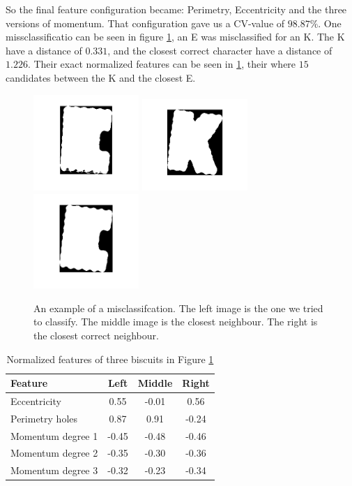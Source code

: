 \documentclass[a4paper,11pt]{article}
\begin{document}
So the final feature configuration became: Perimetry, Eccentricity and the three versions of momentum.
That configuration gave us a CV-value of $98.87\%$.
One missclassificatio can be seen in figure \ref{fig:misclas},
an E was misclassified for an K. The K have a distance of $0.331$,
and the closest correct character have a distance of $1.226$.
Their exact normalized features can be seen in \ref{tab:misclas},
their where $15$ candidates between the K and the closest E.

\begin{figure}[]
\begin{center}
\includegraphics[width=40mm]{original.png}
\includegraphics[width=40mm]{closest.png}
\includegraphics[width=40mm]{closest_correct.png}
\end{center}
\caption{An example of a misclassifcation. 
         The left image is the one we tried to classify. 
         The middle image is the closest neighbour.
         The right is the closest correct neighbour.}
\label{fig:misclas}
\end{figure}

\begin{table}[h!b!p!]
\caption{Normalized features of three biscuits in Figure \ref{fig:misclas}}
\begin{center}
    \begin{tabular}{  l | c | c | c | }
     Feature           & Left  & Middle & Right \\ \hline
     Eccentricity      &  0.55 & -0.01  &  0.56 \\ \hline
     Perimetry holes   &  0.87 &  0.91  & -0.24 \\ \hline
     Momentum degree 1 & -0.45 & -0.48  & -0.46 \\ \hline
     Momentum degree 2 & -0.35 & -0.30  & -0.36 \\ \hline
     Momentum degree 3 & -0.32 & -0.23  & -0.34 \\ \hline
    \end{tabular}
\end{center}
\label{tab:misclas}
\end{table}
\end{document}
